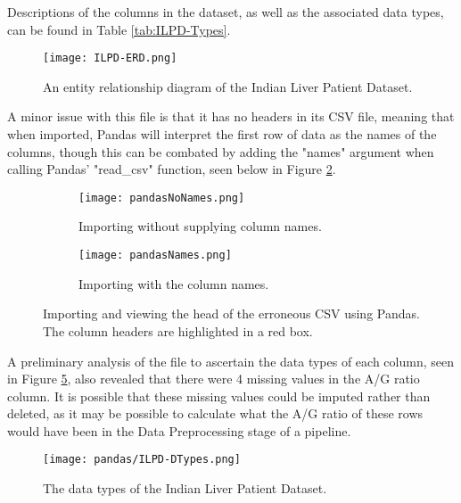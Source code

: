 Descriptions of the columns in the dataset, as well as the associated data types, can be found in Table \ref{tab:ILPD-Types}.

\begin{figure}[H]
    \centering
    \texttt{[image: ILPD-ERD.png]}
    \caption{An entity relationship diagram of the Indian Liver Patient Dataset.}
    \label{fig:ILPD-ERD}
\end{figure}


A minor issue with this file is that it has no headers in its CSV file, meaning that when imported, Pandas will interpret the first 
row of data as the names of the columns, though this can be combated by adding the "names" argument when calling Pandas' "read\_csv" function,
seen below in Figure \ref{fig:pandasNames}. 

\begin{figure}[H]
    \centering
    \begin{subfigure}{0.75\textwidth}
       \texttt{[image: pandasNoNames.png]}
       \caption{Importing without supplying column names.}
       \label{fig:pandasNames} 
    \end{subfigure}
    
    \begin{subfigure}{1\textwidth}
       \texttt{[image: pandasNames.png]}
       \caption{Importing with the column names.}
       \label{fig:PN2}
    \end{subfigure}
    \caption{Importing and viewing the head of the erroneous CSV using Pandas. The column headers are highlighted in a red box.}
\end{figure}

A preliminary analysis of the file to ascertain the data types of each column, seen in Figure \ref{fig:ILPD-DTypes}, also revealed that there were 4 missing values in the A/G ratio column.
It is possible that these missing values could be imputed rather than deleted, as it may be possible to calculate what the A/G ratio of these rows would have been in the 
Data Preprocessing stage of a pipeline.

\begin{figure}[H]
    \centering
    \texttt{[image: pandas/ILPD-DTypes.png]}
    \caption{The data types of the Indian Liver Patient Dataset.}
    \label{fig:ILPD-DTypes}
\end{figure}


